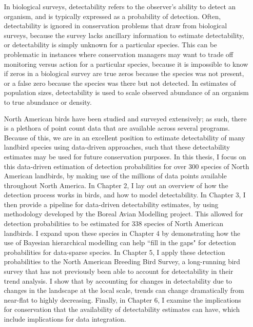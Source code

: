 \par In biological surveys, detectability refers to the observer's ability to detect an organism, and is typically expressed as a probability of detection. 
Often, detectability is ignored in conservation problems that draw from biological surveys, because the survey lacks ancillary information to estimate detectability, or detectability is simply unknown for a particular species.
This can be problematic in instances where conservation managers may want to trade off monitoring versus action for a particular species, because it is impossible to know if zeros in a biological survey are true zeros because the species was not present, or a false zero because the species was there but not detected.
In estimates of population sizes, detectability is used to scale observed abundance of an organism to true abundance or density.
\par North American birds have been studied and surveyed extensively; as such, there is a plethora of point count data that are available across several programs.
Because of this, we are in an excellent position to estimate detectability of many landbird species using data-driven approaches, such that these detectability estimates may be used for future conservation purposes.
In this thesis, I focus on this data-driven estimation of detection probabilities for over 300 species of North American landbirds, by making use of the millions of data points available throughout North America.
In Chapter 2, I lay out an overview of how the detection process works in birds, and how to model detectability.
In Chapter 3, I then provide a pipeline for data-driven detectability estimates, by using methodology developed by the Boreal Avian Modelling project.
This allowed for detection probabilities to be estimated for 338 species of North American landbirds.
I expand upon these species in Chapter 4 by demonstrating how the use of Bayesian hierarchical modelling can help ``fill in the gaps" for detection probabilities for data-sparse species.
In Chapter 5, I apply these detection probabilities to the North American Breeding Bird Survey, a long-running bird survey that has not previously been able to account for detectability in their trend analysis.
I show that by accounting for changes in detectability due to changes in the landscape at the local scale, trends can change dramatically from near-flat to highly decreasing.
Finally, in Chapter 6, I examine the implications for conservation that the availability of detectability estimates can have, which include implications for data integration.

